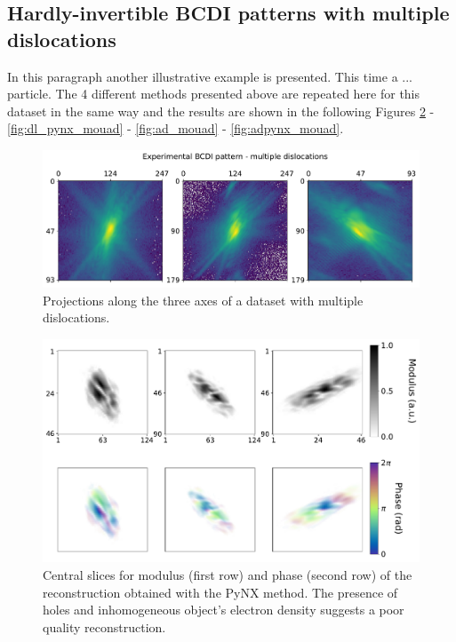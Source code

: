 \subsection{Hardly-invertible BCDI patterns with multiple dislocations}

In this paragraph another illustrative example is presented. This time a ... particle. 
The 4 different methods presented above are repeated here for this dataset in the same way and the results are shown in  
the following Figures \ref{fig:pynx_mouad} - \ref{fig:dl_pynx_mouad} - \ref{fig:ad_mouad} - \ref{fig:adpynx_mouad}. 

\begin{figure}[H]
  \centering
  \includegraphics[width=\textwidth]{figures/AD/projections_mouad.pdf}
  \caption{Projections along the three axes of a dataset with multiple dislocations. }
  \label{fig:projectsions_mouad}
\end{figure}

\begin{figure}[H]
  \centering
  \includegraphics[width=\textwidth]{figures/AD/pynx_mouad.pdf}
  \caption{Central slices for modulus (first row) and phase (second row) of the reconstruction obtained with the PyNX method.
  The presence of holes and inhomogeneous object's electron density suggests a poor quality reconstruction. }
  \label{fig:pynx_mouad}
\end{figure}

